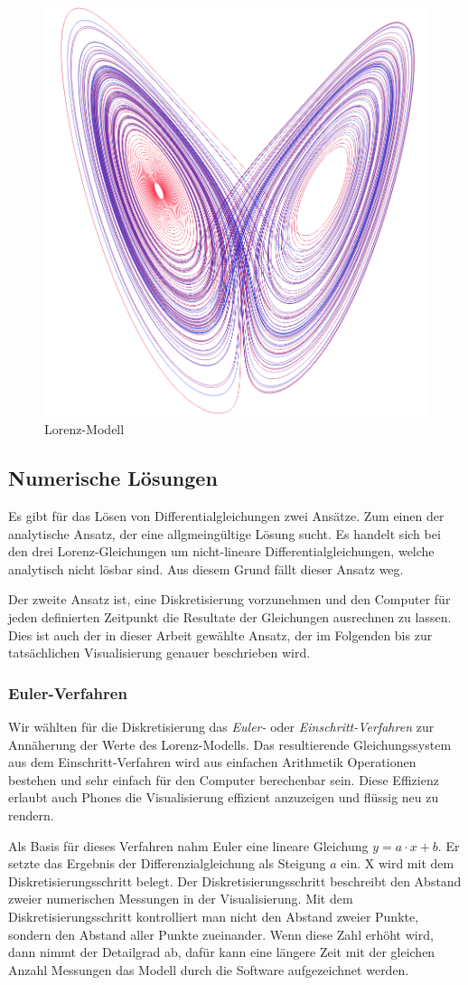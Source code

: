 \begin{figure}
	\centering
	\includegraphics[width=0.3\linewidth]{lorenz/assets/lorenz-modell/lorenz-modell}
	\caption{Lorenz-Modell}
	\label{fig:lorenz-modell}
\end{figure}


\subsection{Numerische Lösungen}
Es gibt für das Lösen von Differentialgleichungen zwei Ansätze. Zum einen der analytische Ansatz, der eine allgmeingültige Lösung sucht. Es handelt sich bei den drei Lorenz-Gleichungen um nicht-lineare Differentialgleichungen, welche analytisch nicht lösbar sind. Aus diesem Grund fällt dieser Ansatz weg. 

Der zweite Ansatz ist, eine Diskretisierung vorzunehmen und den Computer für jeden definierten Zeitpunkt die Resultate der Gleichungen ausrechnen zu lassen. Dies ist auch der in dieser Arbeit gewählte Ansatz, der im Folgenden bis zur tatsächlichen Visualisierung genauer beschrieben wird. 

\subsubsection{Euler-Verfahren}

Wir wählten für die Diskretisierung das \textit{Euler-} oder \textit{Einschritt-Verfahren} zur Annäherung der Werte des Lorenz-Modells. Das resultierende Gleichungssystem aus dem Einschritt-Verfahren wird aus einfachen Arithmetik Operationen bestehen und sehr einfach für den Computer berechenbar sein. Diese Effizienz erlaubt auch Phones die Visualisierung effizient anzuzeigen und flüssig neu zu rendern.

Als Basis für dieses Verfahren nahm Euler eine lineare Gleichung $ y = a \cdot x + b $. Er setzte das Ergebnis der Differenzialgleichung als Steigung $ a $ ein. X wird mit dem Diskretisierungsschritt belegt. Der Diskretisierungsschritt beschreibt den Abstand zweier numerischen Messungen in der Visualisierung. Mit dem Diskretisierungsschritt kontrolliert man nicht den Abstand zweier Punkte, sondern den Abstand aller Punkte zueinander. Wenn diese Zahl erhöht wird, dann nimmt der Detailgrad ab, dafür kann eine längere Zeit mit der gleichen Anzahl Messungen das Modell durch die Software aufgezeichnet werden.

